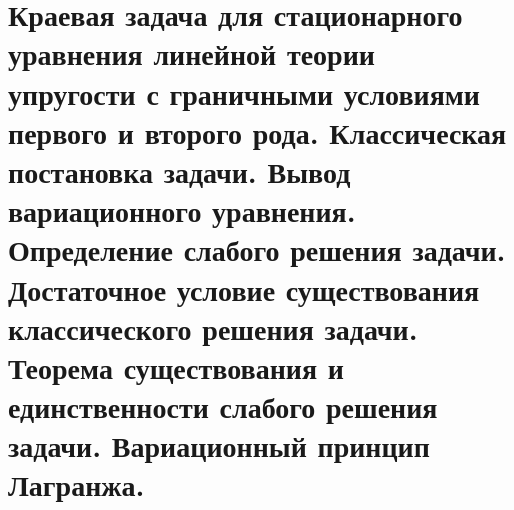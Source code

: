 \documentclass[__main__.tex]{subfiles}
\begin{document}
\section{Краевая задача для стационарного уравнения линейной теории упругости с граничными условиями первого и второго рода. Классическая постановка задачи. Вывод вариационного уравнения. Определение слабого решения задачи. Достаточное условие существования классического решения задачи. Теорема существования и единственности слабого решения задачи. Вариационный принцип Лагранжа.}
\end{document}
